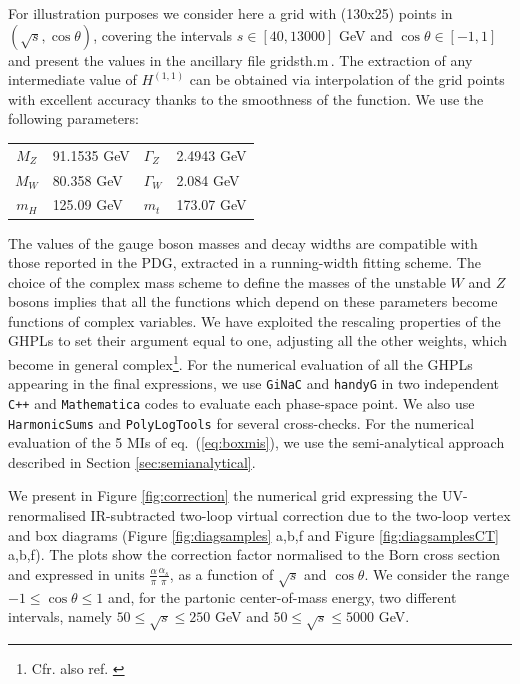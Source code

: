 \documentclass[11pt,a4paper]{article}
\begin{document}
For illustration purposes we consider here a grid with (130x25) points
in $(\sqrt{s},\cos\theta)$,
covering the intervals $s\in [40,13000]$ GeV and $\cos\theta\in [-1,1]$
and present the values in the ancillary file \textsf{gridsth.m}\,.
The extraction of any intermediate value
of ${H}^{(1,1)}$
can be obtained via interpolation of the grid points
with excellent accuracy thanks to the smoothness of the function.
We use the following parameters:
% 
\begin{center}
 \begin{tabular}{c l l l}
 \hline\hline
  $M_Z$ & 91.1535 GeV & $\Gamma_Z$ & 2.4943 GeV\\
  $M_W$ & 80.358 GeV  & $\Gamma_W$ & 2.084 GeV\\
  $m_H$ & 125.09 GeV  & $m_t$ & 173.07 GeV\\
 \hline\hline
 \end{tabular}
% 
\end{center}
%
The values of the gauge boson masses and decay widths
      are compatible with those reported in the PDG\cite{ParticleDataGroup:2020ssz},
      extracted in a running-width fitting scheme.
The choice of the complex mass scheme to define the masses
of the unstable $W$ and $Z$ bosons
implies that all the functions which depend on these parameters
become functions of complex variables.
We have exploited the rescaling properties of the GHPLs
to set their argument equal to one, adjusting all the other weights,
which become in general complex\footnote{Cfr. also ref. \cite{Bonciani:2010ms}}.
%
For the numerical evaluation of all the GHPLs
appearing in the final expressions,
we use {\tt GiNaC} and
{\tt handyG} \cite{Naterop:2019xaf}
in two independent {\tt C++} and {\tt Mathematica} codes
to evaluate each phase-space point.
We also use {\tt HarmonicSums} \cite{Ablinger:2010kw,Ablinger:2014rba} and {\tt PolyLogTools} \cite{Duhr:2019tlz} for several cross-checks.
For the numerical evaluation of the 5 MIs of eq.~(\ref{eq:boxmis}),
we use the semi-analytical approach described
in Section \ref{sec:semianalytical}.


We present in Figure \ref{fig:correction}
the numerical grid expressing the UV-renormalised IR-subtracted
two-loop \oaas virtual correction
due to the two-loop vertex and box diagrams (Figure \ref{fig:diagsamples} a,b,f and Figure \ref{fig:diagsamplesCT} a,b,f).
The plots show the correction factor normalised to the Born cross section
and expressed in units $\frac{\alpha}{\pi} \frac{\alpha_s}{\pi}$,
as a function of $\sqrt{s}$ and $\cos\theta$.
We consider the range $-1\leq\cos\theta\leq 1$ and,
for the partonic center-of-mass energy, two different intervals,
namely $50\leq\sqrt{s}\leq 250$ GeV and $50\leq\sqrt{s}\leq 5000$ GeV.
\end{document}
